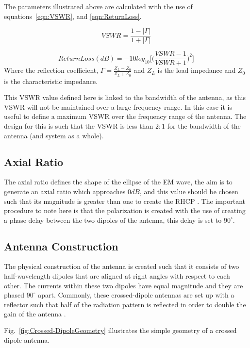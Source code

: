 \documentclass[11pt]{witseiepaper}
\begin{document}
The parameters illustrated above are calculated with the use of equations~\ref{eqn:VSWR}, and \ref{eqn:ReturnLoss}.


\begin{equation} \label{eqn:VSWR}
VSWR = \frac{1 - |\Gamma|}{1 + |\Gamma|}
\end{equation}

\begin{equation} \label{eqn:ReturnLoss}
Return Loss (dB) = -10 log_{10} \Bigg[ \Big(\frac{VSWR - 1}{VSWR + 1} \Big)^2 \Bigg]
\end{equation}
Where the reflection coefficient, $\Gamma = \frac{Z_L - Z_0}{Z_L + Z_0}$ and $Z_L$ is the load impedance and $Z_0$ is the characteristic impedance.

This VSWR value defined here is linked to the bandwidth of the antenna, as this VSWR will not be maintained over a large frequency range. In this case it is useful to define a maximum VSWR over the frequency range of the antenna. The design for this is such that the VSWR is less than $2:1$ for the bandwidth of the antenna (and system as a whole).

\subsection{Axial Ratio} \label{sec:AxialRatio}
The axial ratio defines the shape of the ellipse of the EM wave, the aim is to generate an axial ratio which approaches $0 dB$, and this value should be chosen such that its magnitude is greater than one to create the RHCP \cite[p.~32]{crossedDipoleDesign}.
The important procedure to note here is that the polarization is created with the use of creating a phase delay between the two dipoles of the antenna, this delay is set to $90^{\circ}$. 


\subsection{Antenna Construction} \label{sec:AntennaConstruction}
The physical construction of the antenna is created such that it consists of two half-wavelength dipoles that are aligned at right angles with respect to each other. The currents within these two dipoles have equal magnitude and they are phased $90^{\circ}$ apart. 
Commonly, these crossed-dipole antennas are set up with a reflector such that half of the radiation pattern is reflected in order to double the gain of the antenna \cite[p.~108]{IEEECrossedDipole}. 

Fig.~\ref{fig:Crossed-DipoleGeometry} illustrates the simple geometry of a crossed dipole antenna.
\end{document}
